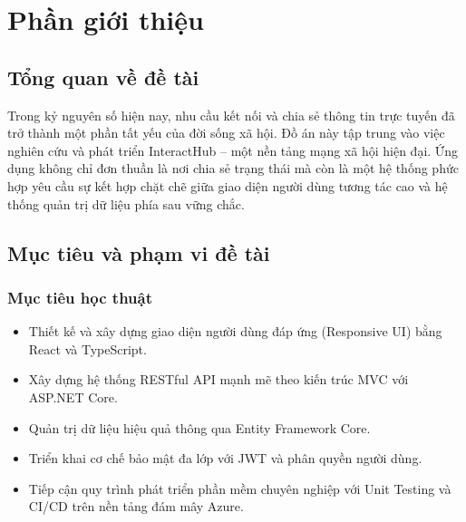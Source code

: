 \documentclass[a4paper]{article}
\begin{document}
\thispagestyle{empty}

\newpage
\tableofcontents
\newpage



\section{Phần giới thiệu}
\subsection{Tổng quan về đề tài}

    Trong kỷ nguyên số hiện nay, nhu cầu kết nối và chia sẻ thông tin trực tuyến đã trở thành một phần tất yếu của đời sống xã hội. Đồ án này tập trung vào việc nghiên cứu và phát triển InteractHub – một nền tảng mạng xã hội hiện đại. Ứng dụng không chỉ đơn thuần là nơi chia sẻ trạng thái mà còn là một hệ thống phức hợp yêu cầu sự kết hợp chặt chẽ giữa giao diện người dùng tương tác cao và hệ thống quản trị dữ liệu phía sau vững chắc.
	
    
	\subsection{Mục tiêu và phạm vi đề tài}
        \subsubsection{Mục tiêu học thuật}
	           \begin{itemize}
	               \item Thiết kế và xây dựng giao diện người dùng đáp ứng (Responsive UI) bằng React và TypeScript.
                   \item Xây dựng hệ thống RESTful API mạnh mẽ theo kiến trúc MVC với ASP.NET Core.
                   \item Quản trị dữ liệu hiệu quả thông qua Entity Framework Core.
                   \item Triển khai cơ chế bảo mật đa lớp với JWT và phân quyền người dùng.
                   \item Tiếp cận quy trình phát triển phần mềm chuyên nghiệp với Unit Testing và CI/CD trên nền tảng đám mây Azure.
	           \end{itemize}
\end{document}
